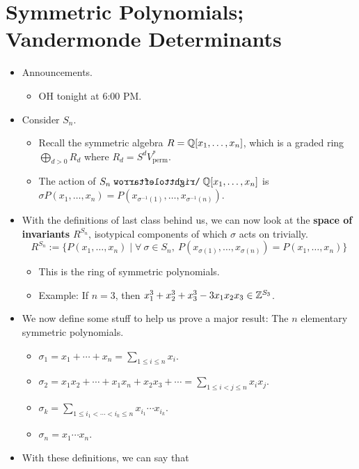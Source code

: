 \documentclass[../notes.tex]{subfiles}
\begin{document}
\section{Symmetric Polynomials; Vandermonde Determinants}
\begin{itemize}
    \item {}Announcements.
    \begin{itemize}
        \item OH tonight at 6:00 PM.
    \end{itemize}
    \item Consider $S_n$.
    \begin{itemize}
        \item Recall the symmetric algebra $R=\mathbb{Q}[x_1,\dots,x_n]$, which is a graded ring $\bigoplus_{d>0}R_d$ where $R_d=S^dV_\text{perm}^*$.
        \item The action of $S_n\acts\Q[x_1,\dots,x_n]$ is $\sigma P(x_1,\dots,x_n)=P(x_{\sigma^{-1}(1)},\dots,x_{\sigma^{-1}(n)})$.
    \end{itemize}
    \item With the definitions of last class behind us, we can now look at the \textbf{space of invariants} $R^{S_n}$, isotypical components of which $\sigma$ acts on trivially.
    \begin{equation*}
        R^{S_n} := \{P(x_1,\dots,x_n)\mid\forall\ \sigma\in S_n,\ P(x_{\sigma(1)},\dots,x_{\sigma(n)})=P(x_1,\dots,x_n)\}
    \end{equation*}
    \begin{itemize}
        \item This is the ring of symmetric polynomials.
        \item Example: If $n=3$, then $x_1^3+x_2^3+x_3^3-3x_1x_2x_3\in\mathbb{Z}^{S_3}$.
    \end{itemize}
    \item We now define some stuff to help us prove a major result: The $n$ elementary symmetric polynomials.
    \begin{itemize}
        \item $\sigma_1=x_1+\cdots+x_n=\sum_{1\leq i\leq n}x_i$.
        \item $\sigma_2=x_1x_2+\cdots+x_1x_n+x_2x_3+\cdots=\sum_{1\leq i<j\leq n}x_ix_j$.
        \item $\sigma_k=\sum_{1\leq i_1<\cdots<i_k\leq n}x_{i_1}\cdots x_{i_k}$.
        \item $\sigma_n=x_1\cdots x_n$.
    \end{itemize}
    \item With these definitions, we can say that

\end{itemize}
\end{document}
